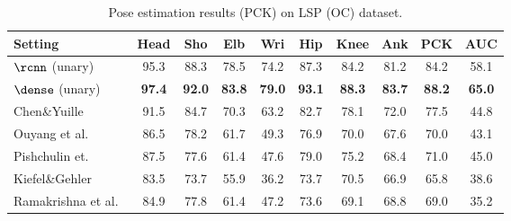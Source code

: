 \tabcolsep 1.5pt
\begin{table}[tbp]
 \scriptsize
  \centering
  \begin{tabular}{@{} l c ccc ccc c|c@{}}
    \toprule
    Setting& Head   & Sho  & Elb & Wri & Hip & Knee & Ank & PCK & AUC\\       
    \midrule
    $\rcnn$ (unary)& 95.3  & 88.3  & 78.5  & 74.2  & 87.3  & 84.2 & 81.2 & 84.2 & 58.1\\
    \midrule
    $\dense$ (unary)  & \textbf{97.4}  & \textbf{92.0}  & \textbf{83.8}  & \textbf{79.0}  & \textbf{93.1}  & \textbf{88.3} & \textbf{83.7} & \textbf{88.2} & \textbf{65.0}\\
    \midrule
    Chen\&Yuille~\cite{chen14nips}& 91.5  & 84.7  & 70.3  & 63.2  & 82.7  & 78.1 & 72.0 & 77.5 & 44.8\\
    Ouyang et al.~\cite{ouyang14cvpr}& 86.5  & 78.2  & 61.7  & 49.3  & 76.9  & 70.0 & 67.6 & 70.0 & 43.1\\
    Pishchulin et.~\cite{pishchulin13iccv}& 87.5  & 77.6  & 61.4  & 47.6  & 79.0  & 75.2 & 68.4 & 71.0& 45.0\\
    Kiefel\&Gehler~\cite{kiefel14eccv} & 83.5  & 73.7  & 55.9  & 36.2  & 73.7  & 70.5 & 66.9 & 65.8 & 38.6\\
    Ramakrishna et al.~\cite{ramakrishna14eccv}& 84.9  & 77.8  & 61.4  & 47.2  & 73.6  & 69.1 & 68.8 & 69.0& 35.2\\
    \bottomrule                   
  \end{tabular}
  \vspace{0.3em} 
  \caption[]{Pose estimation results (PCK) on LSP (OC) dataset.}
  \label{tab:multicut:lsp:oc}
\end{table}
